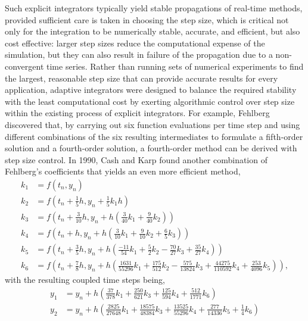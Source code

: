 Such explicit integrators typically yield stable propagations of real-time
methods, provided sufficient care is taken in choosing the step size, which is
critical not only for the integration to be numerically stable, accurate, and
efficient, but also cost effective: larger step sizes reduce the computational
expense of the simulation, but they can also result in failure of the
propagation due to a non-convergent time series.  Rather than running sets of
numerical experiments to find the largest, reasonable step size that can provide
accurate results for every application, adaptive integrators\cite{Press1992}
were designed to balance the required stability with the least computational
cost by exerting algorithmic control over step size  within the existing process of
explicit integrators.  For example, Fehlberg\cite{Fehlberg1968} discovered that,
by carrying out six function evaluations per time step and using different
combinations of the six resulting intermediates to formulate a fifth-order
solution and a fourth-order solution, a fourth-order method can be derived with
step size control.  In 1990, Cash and Karp\cite{Cash1990} found another
combination of Fehlberg's coefficients that yields an even more efficient
method,
\begin{equation}\label{eq:ck-k}
\begin{aligned}
k_{1} &= f(t_{n}, y_{n})\\
k_{2} &= f\left(t_{n}+\frac{1}{5}h, y_{n}+\frac{1}{5}k_{1}h\right)\\
k_{3} &= f\left(t_{n}+\frac{3}{10}h,
y_{n}+h\left(\frac{3}{40}k_{1}+\frac{9}{40}k_{2}\right)\right)\\
k_{4} &= f\left(t_{n}+h,
y_{n}+h\left(\frac{3}{10}k_{1}+\frac{9}{10}k_{2}+\frac{6}{5}k_{3}\right)\right)\\
k_{5} &= f\left(t_{n}+\frac{3}{5}h,
y_{n}+h\left(\frac{-11}{54}k_{1}+\frac{5}{2}k_{2}-\frac{70}{27}k_{3}+\frac{35}{27}k_{4}\right)\right)\\
k_{6} &= f\left(t_{n}+\frac{7}{8}h,
y_{n}+h\left(\frac{1631}{55296}k_{1}+\frac{175}{512}k_{2}-\frac{575}{13824}k_{3}+\frac{44275}{110592}k_{4}+\frac{253}{4096}k_{5}\right)\right),
\end{aligned}
\end{equation}
with the resulting coupled time steps being,
\begin{equation}\label{eq:ck-y}
\begin{aligned}
y_{1} &=
y_{n}+h\left(\frac{37}{378}k_{1}+\frac{250}{621}k_{3}+\frac{125}{594}k_{4}+\frac{512}{1771}k_{6}\right)\\
y_{2} &=
y_{n}+h\left(\frac{2825}{27648}k_{1}+\frac{18575}{48384}k_{3}+\frac{13525}{55296}k_{4}+\frac{277}{14336}k_{5}+\frac{1}{4}k_{6}\right)
\end{aligned}
\end{equation}
